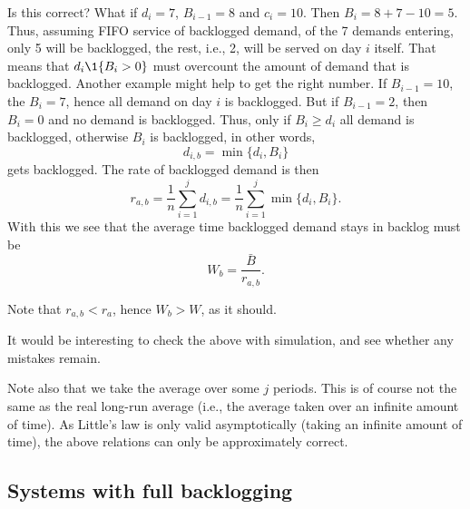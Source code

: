 \begin{question}
\begin{solution}
    Is this correct? What if $d_i=7$, $B_{i-1}=8$ and $c_i= 10$. Then
    $B_{i} = 8+7-10 = 5$. Thus, assuming FIFO service of backlogged
    demand, of the 7 demands entering, only 5 will be backlogged, the
    rest, i.e., 2, will be served on day $i$ itself. That means that
    $d_i \1{B_i>0}$ must overcount the amount of demand that is
    backlogged. Another example might help to get the right number. If
    $B_{i-1}=10$, the $B_i=7$, hence all demand on day $i$ is
    backlogged. But if $B_{i-1}=2$, then $B_i = 0$ and no demand is
    backlogged. Thus, only if $B_i\geq d_i$ all demand is backlogged,
    otherwise $B_i$ is backlogged, in other words, 
    \begin{equation*}
      d_{i,b} = \min\{d_i, B_i\}
    \end{equation*}
    gets backlogged. The rate of  backlogged demand is then
    \begin{equation*}
      r_{a,b} =
      \frac 1 n \sum_{i=1}^j d_{i,b} = \frac 1 n \sum_{i=1}^j \min\{d_i, B_i\}.
    \end{equation*}
    With this we see that the average time backlogged demand stays in
    backlog must be
    \begin{equation*}
      W_b  = \frac{\bar B}{r_{a,b}}. 
    \end{equation*}

    Note that $r_{a,b} < r_a$, hence $W_b > W$, as it should.

    It would be interesting to check the above with simulation, and
    see whether any mistakes remain. 

    Note also that we take the average over some $j$ periods. This is
    of course not the same as the real long-run average (i.e., the
    average taken over an infinite amount of time). As Little's law is
    only valid asymptotically (taking an infinite amount of time), the
    above relations can only be approximately correct.
    
  \end{solution}
\end{question}

\subsection{Systems with full backlogging}
\label{sec:systems-with-backlog}

